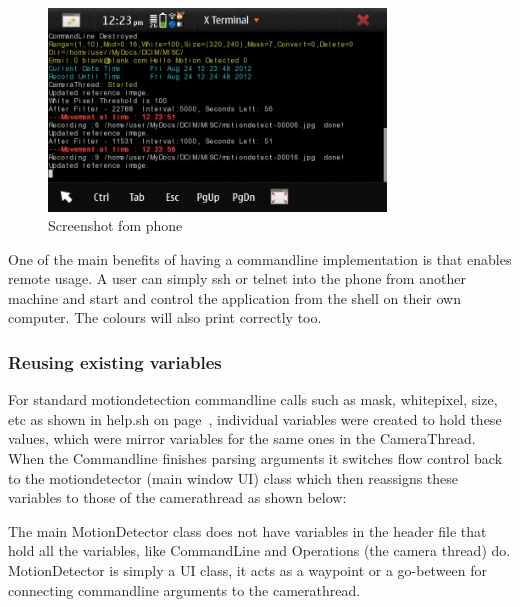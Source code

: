 \documentclass[11pt]{article} %
\begin{document}
{\begin{figure}[H]
	\vspace{-10pt}
	\begin{center}
		\includegraphics[width=0.8\textwidth]{../images/commandline/commandscreen.jpg}
	\end{center}
	\vspace{-20pt}
	\caption{Screenshot fom phone}
	\label{img:command}
	\vspace{-10pt}
\end{figure}

One of the main benefits of having a commandline implementation is that enables remote usage. A user can simply ssh or telnet into the phone from another machine and start and control the application from the shell on their own computer. The colours will also print correctly too.

}
\subsubsection{Reusing existing variables}

For standard motiondetection commandline calls such as mask, whitepixel, size, etc as shown in help.sh on page~\pageref{frame:help}, individual variables were created to hold these values, which were mirror variables for the same ones in the CameraThread. When the Commandline finishes parsing arguments it switches flow control back to the motiondetector (main window UI) class which then reassigns these variables to those of the camerathread as shown below:
\begin{frame}[fragile]

\end{frame}
The main MotionDetector class does not have variables in the header file that hold all the variables, like CommandLine and Operations (the camera thread) do. MotionDetector is simply a UI class, it acts as a waypoint or a go-between for connecting commandline arguments to the camerathread.
\end{document}
